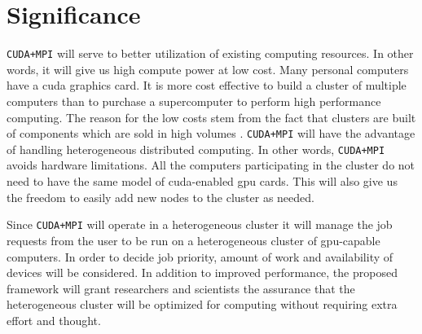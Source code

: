 \section{Significance}

\texttt{CUDA+MPI} will serve to better utilization of existing computing
resources. In other words, it will give us high compute power at low cost. Many
personal computers have a \gls{cuda} graphics card. It is more cost effective
to build a cluster of multiple computers than to purchase a supercomputer to
perform high performance computing. The reason for the low costs stem from the
fact that clusters are built of components which are sold in high volumes
\cite{erdt2008automatic}. \texttt{CUDA+MPI} will have the advantage of handling
heterogeneous distributed computing. In other words, \texttt{CUDA+MPI} avoids
hardware limitations. All the computers participating in the cluster do not
need to have the same model of \gls{cuda}-enabled \gls{gpu} cards. This will
also give us the freedom to easily add new nodes to the cluster as needed.

Since \texttt{CUDA+MPI} will operate in a heterogeneous cluster it will manage
the job requests from the user to be run on a heterogeneous cluster of
\gls{gpu}-capable computers. In order to decide job priority, amount of work
and availability of devices will be considered. In addition to improved
performance, the proposed framework will grant researchers and scientists the
assurance that the heterogeneous cluster will be optimized for computing
without requiring extra effort and thought.
